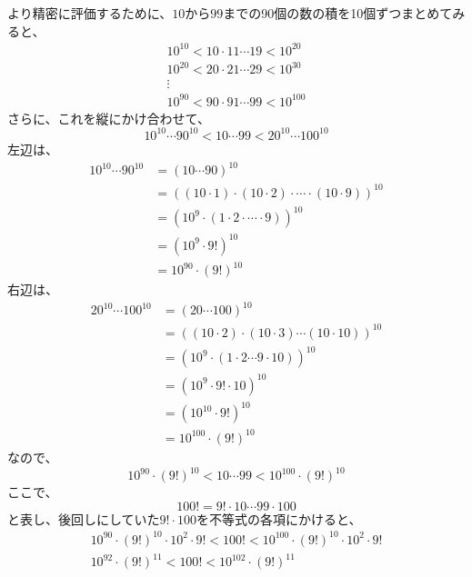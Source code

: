 \documentclass[../book_jiriki_calc]{subfiles}
\begin{document}
より精密に評価するために、$10$から$99$までの90個の数の積を10個ずつまとめてみると、
\begin{gather}
  10^{10} < 10 \cdot 11 \cdots 19 < 10^{20}  \\
  10^{20} < 20 \cdot 21 \cdots 29 < 10^{30}  \\
  \vdots                                     \\
  10^{90} < 90 \cdot 91 \cdots 99 < 10^{100}
\end{gather}
さらに、これを縦にかけ合わせて、
\begin{equation}
  10^{10} \cdots 90^{10} < 10 \cdots 99 < 20^{10} \cdots 100^{10}
\end{equation}
左辺は、
\begin{align}
  10^{10} \cdots 90^{10} & = (10\cdots 90)^{10}                                                                  \\
                         & = \left( (10 \cdot 1) \cdot (10 \cdot 2) \cdot \cdots \cdot (10 \cdot 9) \right)^{10} \\
                         & = \left( 10^9 \cdot (1 \cdot 2 \cdot \cdots \cdot 9) \right)^{10}                     \\
                         & = \left( 10^9 \cdot 9! \right)^{10}                                                   \\
                         & = 10^{90} \cdot (9!)^{10}
\end{align}
右辺は、
\begin{align}
  20^{10} \cdots 100^{10} & = (20\cdots 100)^{10}                                                      \\
                          & = \left( (10 \cdot 2) \cdot (10 \cdot 3) \cdots (10 \cdot 10) \right)^{10} \\
                          & = \left( 10^{9} \cdot (1 \cdot 2 \cdots 9 \cdot 10) \right)^{10}           \\
                          & = \left( 10^{9} \cdot 9! \cdot 10 \right)^{10}                             \\
                          & = \left( 10^{10} \cdot 9! \right)^{10}                                     \\
                          & = 10^{100} \cdot (9!)^{10}
\end{align}
なので、
\begin{equation}
  10^{90} \cdot (9!)^{10} < 10 \cdots 99 < 10^{100} \cdot (9!)^{10}
\end{equation}
ここで、
\begin{equation}
  100! = 9! \cdot 10 \cdots 99 \cdot 100
\end{equation}
と表し、後回しにしていた$9! \cdot 100$を不等式の各項にかけると、
\begin{gather}
  10^{90} \cdot (9!)^{10} \cdot 10^{2} \cdot 9! < 100! < 10^{100} \cdot (9!)^{10} \cdot 10^{2} \cdot 9! \\
  10^{92} \cdot (9!)^{11} < 100! < 10^{102} \cdot (9!)^{11}
\end{gather}
\end{document}
